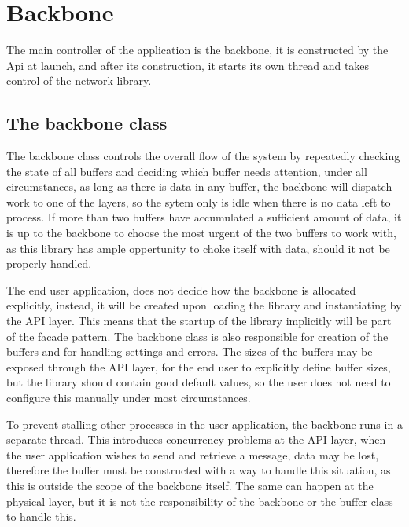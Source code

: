 \chapter{Backbone}\label{chap:backbone}
The main controller of the application is the backbone, it is constructed by the Api at launch, and after its construction, it starts its own thread and takes control of the network library.

\section{The backbone class}
The backbone class controls the overall flow of the system by repeatedly checking the state of all buffers and deciding which buffer needs attention, under all circumstances, as long as there is data in any buffer, the backbone will dispatch work to one of the layers, so the sytem only is idle when there is no data left to process.
If more than two buffers have accumulated a sufficient amount of data, it is up to the backbone to choose the most urgent of the two buffers to work with, as this library has ample oppertunity to choke itself with data, should it not be properly handled.

The end user application, does not decide how the backbone is allocated explicitly, instead, it will be created upon loading the library and instantiating by the API layer. This means that the startup of the library implicitly will be part of the facade pattern.
The backbone class is also responsible for creation of the buffers and for handling settings and errors. The sizes of the buffers may be exposed through the API layer, for the end user to explicitly define buffer sizes, but the library should contain good default values, so the user does not need to configure this manually under most circumstances.

To prevent stalling other processes in the user application, the backbone runs in a separate thread. This introduces concurrency problems at the API layer, when the user application wishes to send and retrieve a message, data may be lost, therefore the buffer must be constructed with a way to handle this situation, as this is outside the scope of the backbone itself.
The same can happen at the physical layer, but it is not the responsibility of the backbone or the buffer class to handle this.

